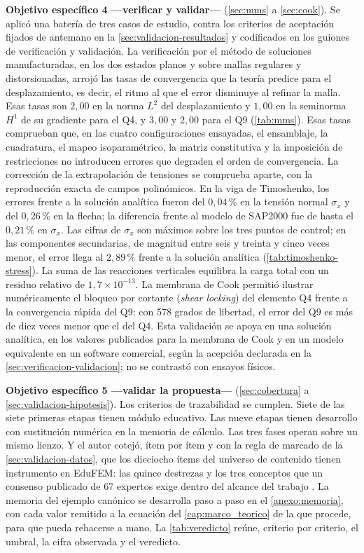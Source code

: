 \textbf{Objetivo específico 4 —verificar y validar—} (\autoref{sec:mms} a \autoref{sec:cook}). Se aplicó una batería de tres casos de estudio, contra los criterios de aceptación fijados de antemano en la \autoref{sec:validacion-resultados} y codificados en los guiones de verificación y validación. La verificación por el método de soluciones manufacturadas, en los dos estados planos y sobre mallas regulares y distorsionadas, arrojó las tasas de convergencia que la teoría predice para el desplazamiento, es decir, el ritmo al que el error disminuye al refinar la malla. Esas tasas son $2{,}00$ en la norma $L^2$ del desplazamiento y $1{,}00$ en la seminorma $H^1$ de su gradiente para el Q4, y $3{,}00$ y $2{,}00$ para el Q9 (\autoref{tab:mms}). Esas tasas comprueban que, en las cuatro configuraciones ensayadas, el ensamblaje, la cuadratura, el mapeo isoparamétrico, la matriz constitutiva y la imposición de restricciones no introducen errores que degraden el orden de convergencia. La corrección de la extrapolación de tensiones se comprueba aparte, con la reproducción exacta de campos polinómicos. En la viga de Timoshenko, los errores frente a la solución analítica fueron del $0{,}04\,\%$ en la tensión normal $\sigma_x$ y del $0{,}26\,\%$ en la flecha; la diferencia frente al modelo de SAP2000 fue de hasta el $0{,}21\,\%$ en $\sigma_x$. Las cifras de $\sigma_x$ son máximos sobre los tres puntos de control; en las componentes secundarias, de magnitud entre seis y treinta y cinco veces menor, el error llega al $2{,}89\,\%$ frente a la solución analítica (\autoref{tab:timoshenko-stress}). La suma de las reacciones verticales equilibra la carga total con un residuo relativo de $1{,}7\times10^{-13}$. La membrana de Cook permitió ilustrar numéricamente el bloqueo por cortante (\emph{shear locking}) del elemento Q4 frente a la convergencia rápida del Q9: con 578 grados de libertad, el error del Q9 es más de diez veces menor que el del Q4. Esta validación se apoya en una solución analítica, en los valores publicados para la membrana de Cook y en un modelo equivalente en un software comercial, según la acepción declarada en la \autoref{sec:verificacion-validacion}; no se contrastó con ensayos físicos.

\textbf{Objetivo específico 5 —validar la propuesta—} (\autoref{sec:cobertura} a \autoref{sec:validacion-hipotesis}). Los criterios de trazabilidad se cumplen. Siete de las siete primeras etapas tienen módulo educativo. Las nueve etapas tienen desarrollo con sustitución numérica en la memoria de cálculo. Las tres fases operan sobre un mismo lienzo. Y el autor cotejó, ítem por ítem y con la regla de marcado de la \autoref{sec:validacion-datos}, que los dieciocho ítems del universo de contenido tienen instrumento en EduFEM: las quince destrezas y los tres conceptos que un consenso publicado de 67 expertos exige dentro del alcance del trabajo \autocite[pp.~1162-1163]{perezsantiago2023fem}. La memoria del ejemplo canónico se desarrolla paso a paso en el \autoref{anexo:memoria}, con cada valor remitido a la ecuación del \autoref{cap:marco_teorico} de la que procede, para que pueda rehacerse a mano. La \autoref{tab:veredicto} reúne, criterio por criterio, el umbral, la cifra observada y el veredicto.

